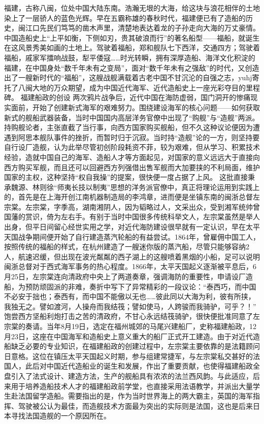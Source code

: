 \documentclass[12pt,UTF8]{ctexbook}
\begin{document}
福建，古称八闽，位处中国大陆东南。浩瀚无垠的大海，给这块与浪花相伴的土地染上了一层骄人的蓝色光辉。早在五霸称雄的春秋时代，福建便已有了造船的历史，闽江口先民们笃笃的凿木声里，清楚地表达着龙的子孙走向大海的万丈豪情。中国造船史上“上平如衡，下侧如刃，贵其破浪而行”的著名船型——福船，就诞生在这风景秀美如画的土地上。驾驶着福船，郑和舰队七下西洋，交通四方；驾驶着福船，戚家军擂响战鼓，犁平倭寇……时光转瞬，拥有深厚造船、海洋文化积淀的福建，在中国身处“数千年未有之变局”，面对“数千年未有之强敌”的时代，又创造出了一艘新时代的“福船”，这艘战舰满载着古老中国不甘沉沦的自强之志，yuhj寄托了八闽大地的万众期望，成为中国近代海军、近代造船史上一座光彩夺目的里程碑。
福建船政的创设
两次鸦片战争后，近代中国在海防虚弱，国门洞开的惨痛现实面前，开始了创建新式海军的艰难努力。围绕建设海军的核心问题——如何获取新式的舰船武器装备，当时中国国内高层洋务官僚中出现了“购舰”与“造舰”两派。持购舰论者，主张直截了当行事，向西方国家购买舰船，但不久这种议论便因为遭遇到阿思本舰队事件的挫折，而暂时归于沉寂。当时持“造舰”论的一方，则坚持要自行设厂造舰，认为此举尽管初创阶段耗资不菲，较为艰难，但从学习、积累技术经验，造就中国自己的海军、造船人才等方面起见，对国家的意义远远大于直接向西方购买军舰，而且还可以回避西方列强借出售军舰而大加要挟的不利局面，维护国家的主权，这种坚持“权自我操”的提案，很快便一度占据了上风。
这批直接秉承魏源、林则徐“师夷长技以制夷”思想的洋务派官僚中，真正将理论运用到实践上的，首先是在上海开创江南机器制造局的李鸿章，进而便是坐镇东南的闽浙总督左宗棠。左宗棠，字季高，湖南湘阴人，因为韬略过人，文采出众，受到湘军统帅曾国藩的赏识，倚为左右手。有别于当时中国很多传统科举文人，左宗棠虽然是举人出身，但平日间留心经世实用之学，对近代海防建设很早就有一定认识，早在太平天国战争期间便开始了自行建造蒸汽轮船的有益尝试。1864年，曾雇佣中国工人，按照传统的福船的样式，在杭州建造了一艘迷你版的蒸汽船，尽管只能够容纳2人，航速迟缓，但出现在波光粼粼的西子湖上的这艘喷着黑烟的小船，足可以说明闽浙总督对于西式海军事务的热心程度。1866年，太平天国起义逐渐被平息后，6月25日，左宗棠连向清政府中央上了两道奏章，强调海防的重要性，申请设厂造船，为预防顽固派的非难，奏折中写下了异常精彩的一段议论：“泰西巧，而中国不必安于拙也；泰西有，而中国不能傲以无也……彼此同以大海为利，彼有所挟，我独无之。譬如渡河，人操舟而我结筏；譬如使马，人跨骏而我骑驴，可乎？！”
饱尝西方坚船利炮打击之苦的清政府，不甘心永远结筏骑驴，很快便批准同意了左宗棠的奏请。当年8月19日，选定在福州城郊的马尾兴建船厂，史称福建船政，12月23日，这座在中国海军和造船史上意义重大的船厂正式开工建造。由于对近代造船缺乏必要的专业知识，在福建船政的创建过程中，左宗棠主要依靠的是法籍顾问日意格。这位在镇压太平天国起义时期，参与组建常捷军，与左宗棠私交甚好的法国人，此后对中国近代造船业的诞生和发展，作出了重要贡献，也使得福建船政全盘引入了法式设计、建造方法，生产的舰船具有浓浓的法兰西风韵。与此适应，后来用于培养造船技术人才的福建船政前学堂，也直接采用法语教学，并派出大量学生赴法国留学造船。需要指出的是，作为当时世界海上的两大霸主，英国的海军指挥、驾驶被公认为最佳，而造舰技术方面最为突出的实际则是法国，这也是后来日本寻找法国造舰的一个原因所在。
\end{document}
